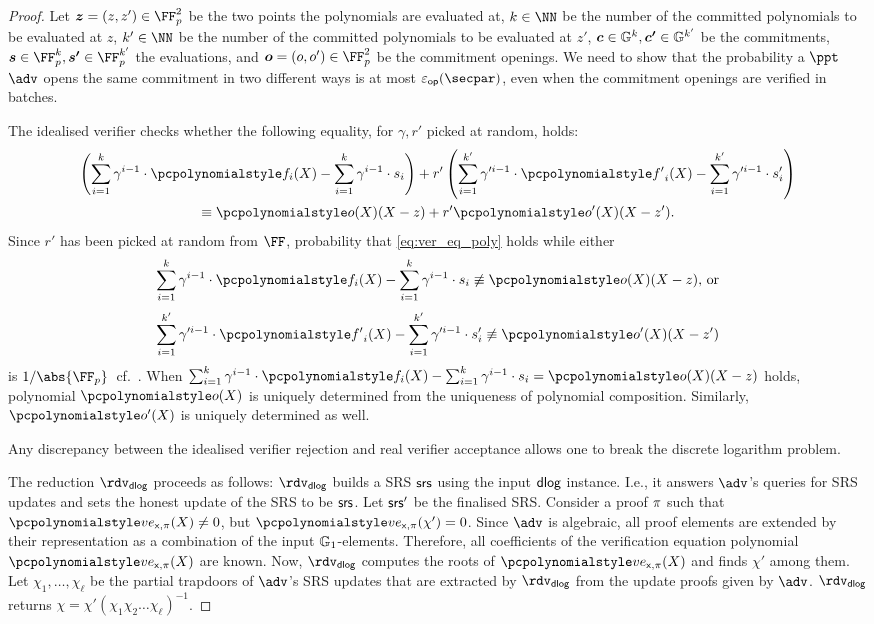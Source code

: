 \begin{proof}
  Let $\vec{z} = (z, z') \in \FF_p^2$ be the two points the polynomials are
  evaluated at, $k \in \NN$ be the number of the committed polynomials to be
  evaluated at $z$, $k' \in \NN$ be the number of the committed polynomials
  to be evaluated at $z'$, $\vec{c} \in \GRP^k, \vec{c'} \in \GRP^{k'}$ be the
  commitments, $\vec{s} \in \FF_p^k, \vec{s'} \in \FF_p^{k'}$ the evaluations,
  and $\vec{o} = (o, o') \in \FF_p^2$ be the commitment openings.  We need to
  show that the probability a $\ppt$ $\adv$ opens the same commitment in two
  different ways is at most $\epsop(\secpar)$, even when the commitment openings
  are verified in batches.

  The idealised verifier checks whether the following equality, for $\gamma, r'$
  picked at random, holds:
  \begin{multline}
    \label{eq:ver_eq_poly}
    \left(\sum_{i = 1}^{k} \gamma^{i - 1} \cdot \p{f}_i(X) - \sum_{i = 1}^{k}
      \gamma^{i - 1} \cdot s_i\right) + r' \left(\sum_{i = 1}^{k'} \gamma'^{i -
        1} \cdot \p{f'}_i(X) -
      \sum_{i = 1}^{k'} \gamma'^{i - 1} \cdot s'_i \right)\\
    \equiv \p{o}(X)(X - z) + r' \p{o}'(X)(X- z').
  \end{multline}
  Since $r'$ has been picked at random from $\FF$, probability that
  \cref{eq:ver_eq_poly} holds while either
  \[
    \sum_{i = 1}^{k} \gamma^{i - 1} \cdot \p{f}_i(X) - \sum_{i = 1}^{k}
    \gamma^{i - 1} \cdot s_i \not\equiv \p{o}(X)(X - z) \text{, or}
  \]
  \[
    \sum_{i = 1}^{k'} \gamma'^{i - 1} \cdot \p{f'}_i(X) - \sum_{i = 1}^{k'}
    \gamma'^{i - 1} \cdot s'_i \not\equiv \p{o'}(X)(X - z')
  \]
  is $\infrac{1}{\abs{\FF_p}}$~cf.~\cite{EPRINT:GabWilCio19}. 
  When \(
    \sum_{i = 1}^{k} \gamma^{i - 1} \cdot \p{f}_i(X) - \sum_{i = 1}^{k}
    \gamma^{i - 1} \cdot s_i = \p{o}(X)(X - z) 
  \)
  holds, polynomial $\p{o}(X)$ is uniquely determined from the uniqueness of
  polynomial composition. Similarly, $\p{o'}(X)$ is uniquely determined as well.

  Any discrepancy
  between the idealised verifier rejection and real verifier acceptance allows
  one to break the discrete logarithm problem.

  The reduction $\rdvdlog$ proceeds as follows: $\rdvdlog$ builds a SRS $\mathsf{srs}$ using the input $\mathsf{dlog}$ instance. I.e., it answers $\adv$'s queries for SRS updates and sets the honest update of the SRS to be $\mathsf{srs}$. Let $\mathsf{srs}'$ be the finalised SRS. 
  Consider a proof $\pi$ such
      that $\vereq_{\inp, \zkproof}(X) \neq 0$, but
      $\vereq_{\inp, \zkproof}(\chi') = 0$. Since $\adv$ is algebraic, all proof
      elements are extended by their representation as a
      combination of the input $\mathbb{G}_1$-elements. Therefore, all coefficients of the
      verification equation polynomial $\vereq_{\inp, \zkproof}(X)$ are known.
   Now, $\rdvdlog$ computes the roots of $\vereq_{\inp, \zkproof}(X)$ and finds $\chi'$ among
      them.
    Let $\chi_1, \ldots, \chi_\ell$ be the partial trapdoors of $\adv$'s SRS updates that are extracted by $\rdvdlog$ from the update proofs given by $\adv$.
  $\rdvdlog$ returns $\chi = \chi' (\chi_1 \chi_2 \ldots \chi_\ell)^{-1}$.
  

\end{proof}

